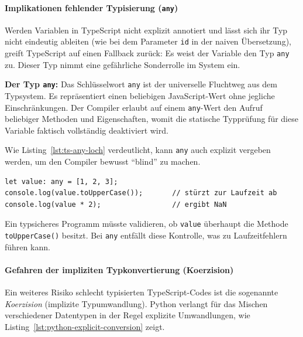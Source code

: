\paragraph{Implikationen fehlender Typisierung (\texttt{any})}
\label{par:any-bedeutung}

Werden Variablen in TypeScript nicht explizit annotiert und lässt sich ihr Typ nicht eindeutig ableiten (wie bei dem Parameter \texttt{id} in der naiven Übersetzung), greift TypeScript auf einen Fallback zurück: Es weist der Variable den Typ \texttt{any} zu. Dieser Typ nimmt eine gefährliche Sonderrolle im System ein.

\begin{definition}
\label{def:ts-any}
\textbf{Der Typ \texttt{any}:} Das Schlüsselwort \texttt{any} ist der universelle Fluchtweg aus dem Typsystem. Es repräsentiert einen beliebigen JavaScript-Wert ohne jegliche Einschränkungen. Der Compiler erlaubt auf einem \texttt{any}-Wert den Aufruf beliebiger Methoden und Eigenschaften, womit die statische Typprüfung für diese Variable faktisch vollständig deaktiviert wird.
\end{definition}

Wie Listing~\ref{lst:ts-any-loch} verdeutlicht, kann \texttt{any} auch explizit vergeben werden, um den Compiler bewusst \enquote{blind} zu machen.

\begin{listing}[htbp]
    \caption{Der Typ \texttt{any} hebelt die Typprüfung aus}
    \label{lst:ts-any-loch}
    \begin{verbatim}
let value: any = [1, 2, 3];
console.log(value.toUpperCase());       // stürzt zur Laufzeit ab
console.log(value * 2);                 // ergibt NaN
    \end{verbatim}
\end{listing}

Ein typsicheres Programm müsste validieren, ob \texttt{value} überhaupt die Methode \texttt{toUpperCase()} besitzt. Bei \texttt{any} entfällt diese Kontrolle, was zu Laufzeitfehlern führen kann.


\paragraph{Gefahren der impliziten Typkonvertierung (Koerzision)}
\label{par:implizite-umwandlung}

Ein weiteres Risiko schlecht typisierten TypeScript-Codes ist die sogenannte \textit{Koerzision} (implizite Typumwandlung). Python verlangt für das Mischen verschiedener Datentypen in der Regel explizite Umwandlungen, wie Listing~\ref{lst:python-explicit-conversion} zeigt.

